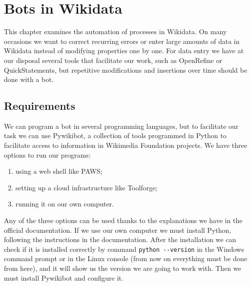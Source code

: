 \chapter{Bots in Wikidata}
\label{ch:bots eng}

This chapter examines the automation of processes in Wikidata. On many occasions we want to correct recurring errors or enter large amounts of data in Wikidata instead of modifying properties one by one. 
For data entry we have at our disposal several tools that facilitate our work, such as OpenRefine %
 or QuickStatements, but repetitive modifications and insertions over time should be done with a bot.


\section{Requirements}%
\label{sec:requirements}
We can program a bot in several programming languages, but to facilitate our task we can use Pywikibot, a collection of tools programmed in Python to facilitate access to information in Wikimedia Foundation projects. We have three options to run our programs:
\begin{enumerate}
  \item using a web shell like PAWS; 
  \item setting up a cloud infrastructure like Toolforge;
  \item running it on our own computer.
\end{enumerate}

Any of the three options can be used 
thanks to the explanations 
we have in the official documentation. 
If we use our own computer we must install Python, following the instructions in the documentation.
After the installation we can check 
if it is installed correctly 
by command \lstinline|python --version| 
in the Windows command prompt or in the Linux console (from now on everything must be done from here), 
and it will show us the version we are going to work with. 
Then we must install Pywikibot and configure it.

